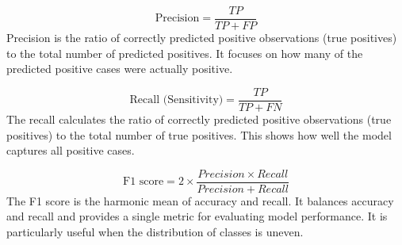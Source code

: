 \[
  \text{Precision} = \frac{TP}{TP + FP}
\]
\indent Precision is the ratio of correctly predicted positive observations (true positives) to the total number of predicted positives. It focuses on how many of the predicted positive cases were actually positive.

\[
  \text{Recall (Sensitivity)} = \frac{TP}{TP + FN}
\]
\indent The recall calculates the ratio of correctly predicted positive observations (true positives) to the total number of true positives. This shows how well the model captures all positive cases.

\[
  \text{F1 score} = 2 \times \frac{Precision \times Recall}{Precision + Recall}
\]
\indent The F1 score is the harmonic mean of accuracy and recall. It balances accuracy and recall and provides a single metric for evaluating model performance. It is particularly useful when the distribution of classes is uneven.